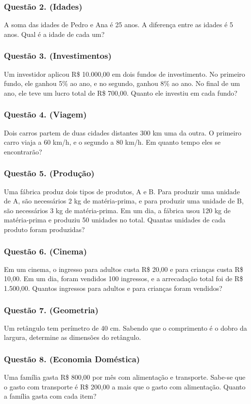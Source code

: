 \documentclass[12pt]{beamer}
\begin{document}
\begin{frame}
\frametitle{Questão 2. (Idades)}
A soma das idades de Pedro e Ana é 25 anos. A diferença entre as idades é 5 anos. Qual é a idade de cada um?
\end{frame}

\begin{frame}
\frametitle{Questão 3. (Investimentos)}
Um investidor aplicou R\$ 10.000,00 em dois fundos de investimento. No primeiro fundo, ele ganhou 5\% ao ano, e no segundo, ganhou 8\% ao ano. No final de um ano, ele teve um lucro total de R\$ 700,00. Quanto ele investiu em cada fundo?
\end{frame}

\begin{frame}
\frametitle{Questão 4. (Viagem)}
Dois carros partem de duas cidades distantes 300 km uma da outra. O primeiro carro viaja a 60 km/h, e o segundo a 80 km/h. Em quanto tempo eles se encontrarão?
\end{frame}

\begin{frame}
\frametitle{Questão 5. (Produção)}
Uma fábrica produz dois tipos de produtos, A e B. Para produzir uma unidade de A, são necessários 2 kg de matéria-prima, e para produzir uma unidade de B, são necessários 3 kg de matéria-prima. Em um dia, a fábrica usou 120 kg de matéria-prima e produziu 50 unidades no total. Quantas unidades de cada produto foram produzidas?
\end{frame}

\begin{frame}
\frametitle{Questão 6. (Cinema)}
Em um cinema, o ingresso para adultos custa R\$ 20,00 e para crianças custa R\$ 10,00. Em um dia, foram vendidos 100 ingressos, e a arrecadação total foi de R\$ 1.500,00. Quantos ingressos para adultos e para crianças foram vendidos?
\end{frame}

\begin{frame}
\frametitle{Questão 7. (Geometria)}
Um retângulo tem perímetro de 40 cm. Sabendo que o comprimento é o dobro da largura, determine as dimensões do retângulo.
\end{frame}

\begin{frame}
\frametitle{Questão 8. (Economia Doméstica)}
Uma família gasta R\$ 800,00 por mês com alimentação e transporte. Sabe-se que o gasto com transporte é R\$ 200,00 a mais que o gasto com alimentação. Quanto a família gasta com cada item?
\end{frame}
\end{document}
